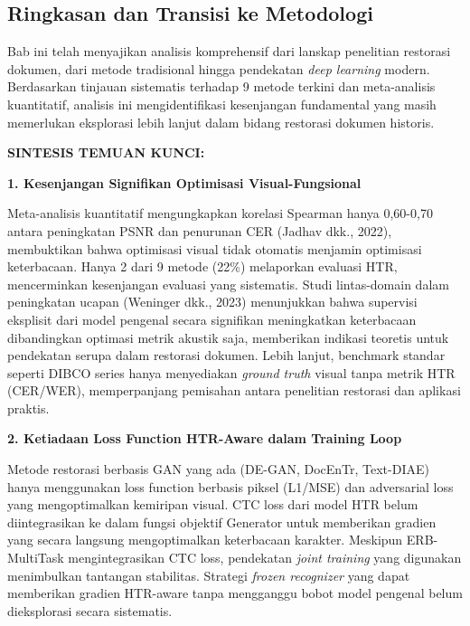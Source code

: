 \subsection{Ringkasan dan Transisi ke Metodologi}
\label{subsec:tinjauan-summary}

Bab ini telah menyajikan analisis komprehensif dari lanskap penelitian restorasi dokumen, dari metode tradisional hingga pendekatan \textit{deep learning} modern. Berdasarkan tinjauan sistematis terhadap 9 metode terkini dan meta-analisis kuantitatif, analisis ini mengidentifikasi kesenjangan fundamental yang masih memerlukan eksplorasi lebih lanjut dalam bidang restorasi dokumen historis.

\vspace{1ex}
\noindent\textbf{SINTESIS TEMUAN KUNCI:}
\vspace{0.5em}

\noindent\textbf{1. Kesenjangan Signifikan Optimisasi Visual-Fungsional}

Meta-analisis kuantitatif mengungkapkan korelasi Spearman hanya 0,60-0,70 antara peningkatan PSNR dan penurunan CER (Jadhav dkk., 2022), membuktikan bahwa optimisasi visual tidak otomatis menjamin optimisasi keterbacaan. Hanya 2 dari 9 metode (22\%) melaporkan evaluasi HTR, mencerminkan kesenjangan evaluasi yang sistematis. Studi lintas-domain dalam peningkatan ucapan (Weninger dkk., 2023) menunjukkan bahwa supervisi eksplisit dari model pengenal secara signifikan meningkatkan keterbacaan dibandingkan optimasi metrik akustik saja, memberikan indikasi teoretis untuk pendekatan serupa dalam restorasi dokumen. Lebih lanjut, benchmark standar seperti DIBCO series hanya menyediakan \textit{ground truth} visual tanpa metrik HTR (CER/WER), memperpanjang pemisahan antara penelitian restorasi dan aplikasi praktis.

\vspace{0.5em}
\noindent\textbf{2. Ketiadaan Loss Function HTR-Aware dalam Training Loop}

Metode restorasi berbasis GAN yang ada (DE-GAN, DocEnTr, Text-DIAE) hanya menggunakan loss function berbasis piksel (L1/MSE) dan adversarial loss yang mengoptimalkan kemiripan visual. CTC loss dari model HTR belum diintegrasikan ke dalam fungsi objektif Generator untuk memberikan gradien yang secara langsung mengoptimalkan keterbacaan karakter. Meskipun ERB-MultiTask mengintegrasikan CTC loss, pendekatan \textit{joint training} yang digunakan menimbulkan tantangan stabilitas. Strategi \textit{frozen recognizer} yang dapat memberikan gradien HTR-aware tanpa mengganggu bobot model pengenal belum dieksplorasi secara sistematis.


